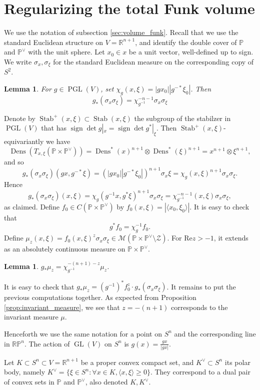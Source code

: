 \documentclass[reqno,10pt]{amsart}
\newcounter{mp}
\newtheorem{Lemma}[Proposition]{Lemma}
\DeclareMathOperator{\Dens}{Dens}
\DeclareMathOperator{\Stab}{Stab}
\DeclareMathOperator{\GL}{GL}
\DeclareMathOperator{\PGL}{PGL}
\DeclareMathOperator{\sign}{sign}
\newcommand{\R}{\mathbb{R}}
\newcommand{\PP}{\mathbb{P}}
\begin{document}
\section{Regularizing the total Funk volume} \label{sec:projective_total_volume}
We use the notation of subsection \ref{sec:volume_funk}. Recall that we use the standard Euclidean structure on $V=\R^{n+1}$, and identify the double cover of $\PP$ and $\PP^\vee$ with the unit sphere. Let $x_0\in x$ be a unit vector, well-defined up to sign. We write $\sigma_x, \sigma_\xi$ for the standard Euclidean measure on the corresponding copy of $S^2$.


\begin{Lemma}\label{lem:lemma91}For $g\in \PGL(V)$, set $\chi_g(x,\xi)=|gx_0||g^{-*}\xi_0|$.  Then
	\[g_*(\sigma_x\sigma_\xi)=\chi_{g^{-1}}^{-n-1}\sigma_x\sigma_\xi\]
\end{Lemma} 
\proof
Denote by $\Stab^+(x,\xi)\subset\Stab(x,\xi)$ the subgroup of the stabilzer in $\PGL(V)$ that has $\sign \det g|_x=\sign \det g^*|_\xi$. Then $\Stab^+(x,\xi)$-equivariantly we have $$\Dens(T_{x,\xi}(\PP\times \PP^\vee))=\Dens^*(x)^{n+1}\otimes\Dens^*(\xi)^{n+1}=x^{n+1}\otimes \xi^{n+1},$$
and so
\[g_*(\sigma_x\sigma_\xi)(gx,g^{-*}\xi)=(|gx_0||g^{-*}\xi_0|)^{n+1}\sigma_x\xi=\chi_g(x,\xi)^{n+1}\sigma_x\sigma_\xi.\]
Hence
\[g_*(\sigma_x\sigma_\xi)(x,\xi)=\chi_g(g^{-1}x,g^*\xi)^{n+1}\sigma_x\sigma_\xi=\chi_{g^{-1}}^{-n-1}(x,\xi)\sigma_x\sigma_\xi,\]
as claimed.
\endproof
Define $f_0\in C(\PP\times\PP^\vee)$ by $f_0(x,\xi)=|\langle x_0,\xi_0\rangle|$.
It is easy to check that \[ g^*f_0=\chi_g^{-1}f_0.\]
Define $\mu_z(x,\xi)=f_0(x,\xi)^z\sigma_x\sigma_\xi\in \mathcal M(\PP\times\PP^\vee\setminus \mathcal Z)$. For $\textrm{Re}z>-1$, it extends as an absolutely continuous measure on $\PP\times\PP^\vee$.
\begin{Lemma}\label{lem:measure_push}
	$g_*\mu_z=\chi_{g^{-1}}^{-(n+1)-z}\mu_z$.
\end{Lemma}
\proof
It is easy to check that $g_*\mu_z=(g^{-1})^*f_0^z\cdot g_*(\sigma_x\sigma_\xi)$. It remains to put the previous computations together.
\endproof
As expected from Proposition \ref{prop:invariant_measure}, we see that $z=-(n+1)$ corresponds to the invariant measure $\mu$.

Henceforth we use the same notation for a point on $S^n$ and the corresponding line in $\R\PP^n$. The action of $\GL(V)$ on $S^n$ is $g(x)=\frac{gx}{|gx|}$.

Let $K\subset S^n\subset V=\R^{n+1}$ be a proper convex compact set, and $K^\vee\subset S^n$ its polar body, namely $K^\vee=\{\xi\in S^{n}: \forall x\in K, \langle x,\xi\rangle\geq 0\}$. They correspond to a dual pair of convex sets in $\PP$ and $\PP^\vee$, also denoted $K, K^\vee$.
\end{document}
